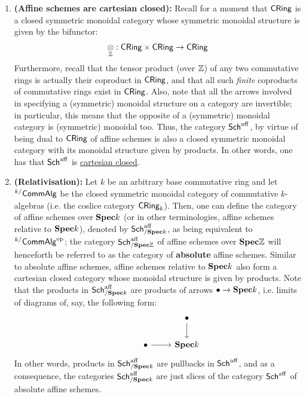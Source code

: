                 \begin{remark} \label{remark: monoidal_structure_on_affine_schemes}
                    \noindent
                    \begin{enumerate}
                        \item \textbf{(Affine schemes are cartesian closed):} Recall for a moment that $\mathsf{CRing}$ is a closed symmetric monoidal category whose symmetric monoidal structure is given by the bifunctor:
                            $$\tensor_{\Z}: \Cring \x \Cring \to \Cring$$
                        Furthermore, recall that the tensor product (over $\mathbb{Z}$) of any two commutative rings is actually their coproduct in $\mathsf{CRing}$, and that all such \textit{finite} coproducts of commutative rings exist in $\mathsf{CRing}$. Also, note that all the arrows involved in specifying a (symmetric) monoidal structure on a category are invertible; in particular, this means that the opposite of a (symmetric) monoidal category is (symmetric) monoidal too. Thus, the category $\mathsf{Sch}^{\mathrm{aff}}$, by virtue of being dual to $\mathsf{CRing}$ of affine schemes is also a closed symmetric monoidal category with its monoidal structure given by products. In other words, one has that $\mathsf{Sch}^{\mathrm{aff}}$ is \href{https://ncatlab.org/nlab/show/cartesian+closed+category}{\underline{cartesian closed}}.
                        \item \textbf{(Relativisation):} Let $k$ be an arbitrary base commutative ring and let ${}^{k/}\mathsf{Comm}\mathsf{Alg}$ be the closed symmetric monoidal category of commutative $k$-algebras (i.e. the coslice category $\mathsf{CRing}_k$). Then, one can define the category of affine schemes over $\mathbf{Spec} k$ (or in other terminologies, affine schemes relative to $\mathbf{Spec} k$), denoted by $\mathsf{Sch}^{\mathrm{aff}}_{/\mathbf{Spec} k}$, as being equivalent to ${}^{k/}\mathsf{Comm}\mathsf{Alg}^{\mathrm{op}}$; the category $\mathsf{Sch}^{\mathrm{aff}}_{/\mathbf{Spec} \mathbb{Z}}$ of affine schemes over $\mathbf{Spec} \mathbb{Z}$ will henceforth be referred to as the category of \textbf{absolute} affine schemes. Similar to absolute affine schemes, affine schemes relative to $\mathbf{Spec} k$ also form a cartesian closed category whose monoidal structure is given by products. Note that the products in $\mathsf{Sch}^{\mathrm{aff}}_{/\mathbf{Spec} k}$ are products of arrows $\bullet \to \mathbf{Spec} k$, i.e. limits of diagrams of, say, the following form:
                            $$
                                \begin{tikzcd}
                                	&& {\bullet} \\
                                	{} & {\bullet} & {\Spec k}
                                	\arrow[from=2-2, to=2-3]
                                	\arrow[from=1-3, to=2-3]
                                \end{tikzcd}
                            $$
                        In other words, products in $\mathsf{Sch}^{\mathrm{aff}}_{/\mathbf{Spec} k}$ are pullbacks in $\mathsf{Sch}^{\mathrm{aff}}$, and as a consequence, the categories $\mathsf{Sch}^{\mathrm{aff}}_{/\mathbf{Spec} k}$ are just slices of the category $\mathsf{Sch}^{\mathrm{aff}}$ of absolute affine schemes.
                    \end{enumerate}
                \end{remark}
                
